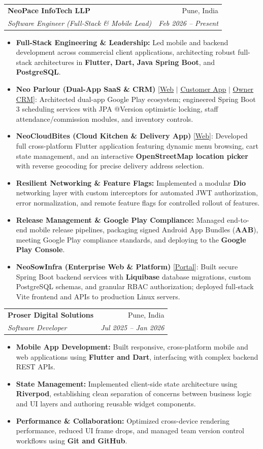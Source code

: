 \documentclass[letterpaper,10.8pt]{article}
\makeatletter
\newcommand{\resumeItem}[1]{
  \item\small{
    {#1 \vspace{-2pt}}
  }
}
\newcommand{\resumeSubheading}[4]{
  \vspace{-2pt}\item
    \begin{tabular*}{0.98\textwidth}[t]{l@{\extracolsep{\fill}}r}
      \textbf{#1} & #2 \\
      \textit{\small#3} & \textit{\small #4} \\
    \end{tabular*}\vspace{-6pt}
}
\newcommand{\resumeItemListStart}{\begin{itemize}[leftmargin=0.15in, label=\textbullet]}
\newcommand{\resumeItemListEnd}{\end{itemize}\vspace{-4pt}}
\makeatother
\begin{document}
    \resumeSubheading
      {NeoPace InfoTech LLP}{Pune, India}
      {Software Engineer (Full-Stack \& Mobile Lead)}{Feb 2026 -- Present}
      \resumeItemListStart
        \resumeItem{\textbf{Full-Stack Engineering \& Leadership:} Led mobile and backend development across commercial client applications, architecting robust full-stack architectures in \textbf{Flutter, Dart, Java Spring Boot}, and \textbf{PostgreSQL}.}
        \resumeItem{\textbf{Neo Parlour (Dual-App SaaS \& CRM)} [\href{https://www.neoparlour.com/}{\underline{Web}} $|$ \href{https://play.google.com/store/apps/details?id=com.neoparlour.customer}{\underline{Customer App}} $|$ \href{https://play.google.com/store/apps/details?id=com.neoparlour.owner}{\underline{Owner CRM}}]: Architected dual-app Google Play ecosystem; engineered Spring Boot 3 scheduling services with JPA @Version optimistic locking, staff attendance/commission modules, and inventory controls.}
        \resumeItem{\textbf{NeoCloudBites (Cloud Kitchen \& Delivery App)} [\href{https://neocloudbites.com/}{\underline{Web}}]: Developed full cross-platform Flutter application featuring dynamic menu browsing, cart state management, and an interactive \textbf{OpenStreetMap location picker} with reverse geocoding for precise delivery address selection.}
        \resumeItem{\textbf{Resilient Networking \& Feature Flags:} Implemented a modular \textbf{Dio} networking layer with custom interceptors for automated JWT authorization, error normalization, and remote feature flags for controlled rollout of features.}
        \resumeItem{\textbf{Release Management \& Google Play Compliance:} Managed end-to-end mobile release pipelines, packaging signed Android App Bundles (\textbf{AAB}), meeting Google Play compliance standards, and deploying to the \textbf{Google Play Console}.}
        \resumeItem{\textbf{NeoSowInfra (Enterprise Web \& Platform)} [\href{https://neosowinfra.com/login}{\underline{Portal}}]: Built secure Spring Boot backend services with \textbf{Liquibase} database migrations, custom PostgreSQL schemas, and granular RBAC authorization; deployed full-stack Vite frontend and APIs to production Linux servers.}
      \resumeItemListEnd

    \resumeSubheading
      {Proser Digital Solutions}{Pune, India}
      {Software Developer}{Jul 2025 -- Jan 2026}
      \resumeItemListStart
        \resumeItem{\textbf{Mobile App Development:} Built responsive, cross-platform mobile and web applications using \textbf{Flutter and Dart}, interfacing with complex backend REST APIs.}
        \resumeItem{\textbf{State Management:} Implemented client-side state architecture using \textbf{Riverpod}, establishing clean separation of concerns between business logic and UI layers and authoring reusable widget components.}
        \resumeItem{\textbf{Performance \& Collaboration:} Optimized cross-device rendering performance, reduced UI frame drops, and managed team version control workflows using \textbf{Git and GitHub}.}
      \resumeItemListEnd
\end{document}
